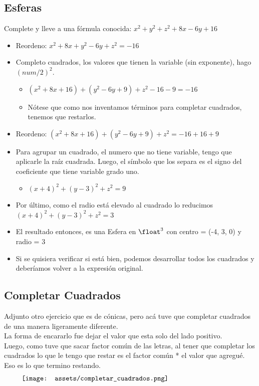 \documentclass[10pt,a4paper]{article}
\begin{document}
\subsection*{Esferas}
\label{subsec:completar_cuadrados_esfera}
Complete y lleve a una fórmula conocida: $x^{2} + y^{2} + z^{2} + 8x - 6y + 16$ 
\begin{itemize}
    \item Reordeno: $x^{2} + 8x + y^{2} - 6y +z^{2} = -16$ 
    \item Completo cuadrados, los valores que tienen la variable (sin exponente), hago $(num/2)^{2}$.
    \begin{itemize}
        \item $(x^{2} + 8x + 16) + (y^{2} - 6y + 9) + z^{2} - 16 - 9 = -16$
        \item Nótese que como nos inventamos términos para completar cuadrados, tenemos que restarlos.
    \end{itemize}
    \item Reordeno: $(x^{2} + 8x + 16) + (y^{2} - 6y + 9) + z^{2} = -16 + 16 + 9$
    \item Para agrupar un cuadrado, el numero que no tiene variable, tengo que aplicarle la raíz cuadrada. Luego, el símbolo que los separa es el signo del coeficiente que tiene variable grado uno.
    \begin{itemize}
        \item $(x+4)^{2} + (y-3)^{2} + z^{2} = 9$
    \end{itemize}
    \item Por último, como el radio está elevado al cuadrado lo reducimos $(x+4)^{2} + (y-3)^{2} + z^{2} = 3$
    \item El resultado entonces, es una Esfera en $\float^{3}$ con centro = (-4, 3, 0) y radio = 3
    \item Si se quisiera verificar si está bien, podemos desarrollar todos los cuadrados y deberíamos volver a la expresión original.
\end{itemize}
\subsection*{Completar Cuadrados}
Adjunto otro ejercicio que es de cónicas, pero acá tuve que completar cuadrados de una manera ligeramente diferente. \\
La forma de encararlo fue dejar el valor que esta solo del lado positivo. \\
Luego, como tuve que sacar factor común de las letras, al tener que completar los cuadrados lo que le tengo que restar es el factor común * el valor que agregué. Eso es lo que termino restando. 
\[\begin{minipage}[b]{0.9\textwidth}
    \texttt{[image: assets/completar\_cuadrados.png]}
\end{minipage}\]
\end{document}
